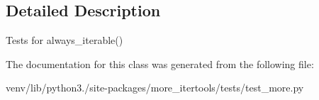 \subsection{Detailed Description}
\begin{DoxyVerb}Tests for always_iterable()\end{DoxyVerb}
 

The documentation for this class was generated from the following file\+:\begin{DoxyCompactItemize}
\item 
venv/lib/python3./site-\/packages/more\+\_\+itertools/tests/test\+\_\+more.\+py\end{DoxyCompactItemize}
